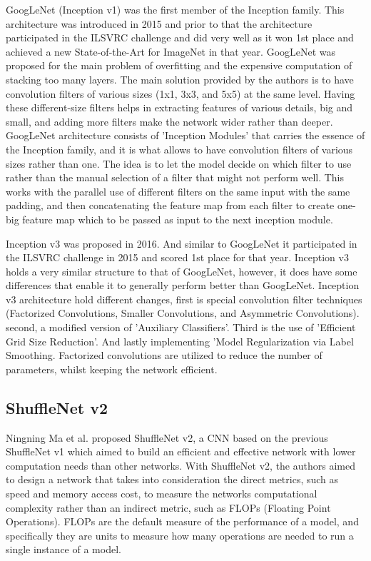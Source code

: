 \documentclass[conference]{IEEEtran}
\begin{document}
GoogLeNet (Inception v1) was the first member of the Inception family. This architecture was introduced in 2015 and prior to that the architecture participated in the ILSVRC challenge and did very well as it won 1st place and achieved a new State-of-the-Art for ImageNet in that year. GoogLeNet was proposed for the main problem of overfitting and the expensive computation of stacking too many layers. The main solution provided by the authors is to have convolution filters of various sizes (1x1, 3x3, and 5x5) at the same level. Having these different-size filters helps in extracting features of various details, big and small, and adding more filters make the network wider rather than deeper. 
GoogLeNet architecture consists of 'Inception Modules' that carries the essence of the Inception family, and it is what allows to have convolution filters of various sizes rather than one. The idea is to let the model decide on which filter to use rather than the manual selection of a filter that might not perform well. This works with the parallel use of different filters on the same input with the same padding, and then concatenating the feature map from each filter to create one-big feature map which to be passed as input to the next inception module. 

Inception v3 was proposed in 2016. And similar to GoogLeNet it participated in the ILSVRC challenge in 2015 and scored 1st place for that year. Inception v3 holds a very similar structure to that of GoogLeNet, however, it does have some differences that enable it to generally perform better than GoogLeNet. Inception v3 architecture hold different changes, first is special convolution filter techniques (Factorized Convolutions, Smaller Convolutions, and Asymmetric Convolutions). second, a modified version of 'Auxiliary Classifiers'. Third is the use of 'Efficient Grid Size Reduction'. And lastly implementing 'Model Regularization via Label Smoothing. Factorized convolutions are utilized to reduce the number of parameters, whilst keeping the network efficient. 

\subsection{ShuffleNet v2}
Ningning Ma et al. proposed ShuffleNet v2, a CNN based on the previous ShuffleNet v1 which aimed to build an efficient and effective network with lower computation needs than other networks. With ShuffleNet v2, the authors aimed to design a network that takes into consideration the direct metrics, such as speed and memory access cost, to measure the networks computational complexity rather than an indirect metric, such as FLOPs (Floating Point Operations). FLOPs are the default measure of the performance of a model, and specifically they are units to measure how many operations are needed to run a single instance of a model. 
\end{document}
